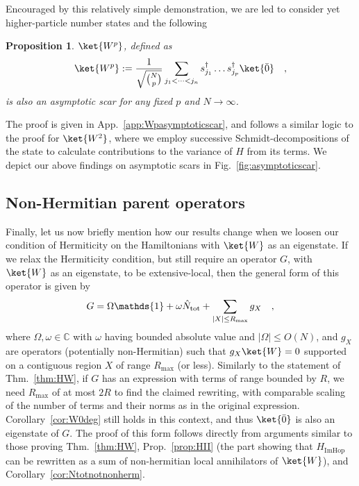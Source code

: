 \documentclass[prx,letterpaper,aps,superscriptaddress,floatfix,twocolumn,nofootinbib]{revtex4-2}
\newtheorem{prop}{Proposition}
\theoremstyle{definition}
\newcommand{\defn}{:=}
\begin{document}
%
Encouraged by this relatively simple demonstration, we are led to consider yet higher-particle number states and the following
\begin{prop}
\label{prop:Wpasymptoticscar}
    $\ket{W^p}$, defined as
    \begin{align}
        \ket{W^p} \defn \frac{1}{\sqrt{\binom{N}{p}}}\sum_{j_1 < \dots < j_n} s_{j_1}^\dag \dots s_{j_p}^\dag \ket{\bar{0}} \quad,
        \label{eq:Whigher}
    \end{align}
    is also an asymptotic scar for any fixed $p$ and $N \to \infty$.
\end{prop}
The proof is given in App.~\ref{app:Wpasymptoticscar}, and follows a similar logic to the proof for $\ket{W^2}$, where we employ successive Schmidt-decompositions of the state to calculate contributions to the variance of $H$ from its terms.
We depict our above findings on asymptotic scars in Fig.~\ref{fig:asymptoticscar}.
%

%
\subsection{ Non-Hermitian parent operators}
\label{sec:nonHerm}
%
Finally, let us now briefly mention how our results change when we loosen our condition of Hermiticity on the Hamiltonians with $\ket{W}$ as an eigenstate.
%
If we relax the Hermiticity condition, but still require an operator $G$, with $\ket{W}$ as an eigenstate, to be extensive-local, then the general form of this operator is given by
\begin{align}
    \label{eq:GW}
    G = \Omega\mathds{1}+\omega \hat{N}_{\rm tot} + \sum_{|X|\leq R_{\text{max}}} g_X\quad,
\end{align}
where $\Omega,\omega\in\mathbb{C}$ with $\omega$ having bounded absolute value and $|\Omega| \leq O(N)$, and $g_X$ are operators (potentially non-Hermitian) such that $g_X\ket{W}=0$ supported on a contiguous region $X$ of range $R_{\text{max}}$ (or less).
%
Similarly to the statement of Thm.~\ref{thm:HW}, if $G$ has an expression with terms of range bounded by $R$, we need $R_{\text{max}}$ of at most $2R$ to find the claimed rewriting, with comparable scaling of the number of terms and their norms as in the original expression.
%
Corollary~\ref{cor:W0deg} still holds in this context, and thus $\ket{\bar{0}}$ is also an eigenstate of $G$.
%
The proof of this form follows directly from arguments similar to those proving Thm.~\ref{thm:HW}, Prop.~\ref{prop:HII} (the part showing that $H_{\text{ImHop}}$ can be rewritten as a sum of non-hermitian local annihilators of $\ket{W}$), and Corollary~\ref{cor:Ntotnotnonherm}.
%
\end{document}
